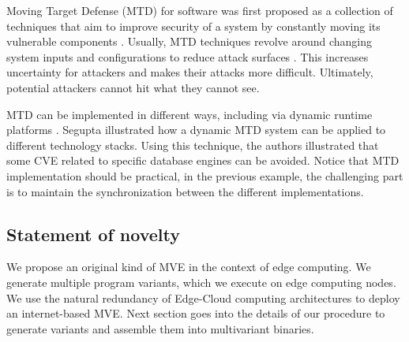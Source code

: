 Moving Target Defense (MTD) for software was first proposed  as a collection of techniques that aim to improve security of a system by constantly moving its vulnerable components \cite{MTDNationalCyberLaep}.
Usually, MTD techniques revolve around changing system inputs and configurations to reduce attack surfaces . 
This increases uncertainty for attackers and makes their attacks more difficult. 
Ultimately, potential attackers cannot hit what they cannot see. 

MTD can be implemented in different ways, including via dynamic runtime platforms \cite{10.1145/3318216.3363338}. 
Segupta \etal illustrated how a dynamic MTD system \cite{10.5555/3091125.3091155} can be applied to different technology stacks.
Using this technique, the authors illustrated that some CVE related to specific database engines can be avoided.
Notice that MTD implementation should be practical, in the previous example, the challenging part is to maintain the synchronization between the different implementations.






\subsection*{Statement of novelty}
\label{sota:contribs}


We propose an original kind of MVE in the context of edge computing. We generate multiple program variants, which we execute on edge computing nodes. We use the natural redundancy of Edge-Cloud computing architectures to deploy an internet-based MVE. Next section goes into the details of our procedure to generate variants and assemble them into multivariant binaries.


